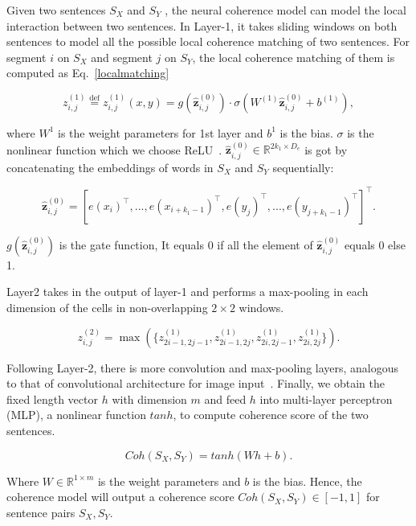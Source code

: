\documentclass[letterpaper]{article} %
\begin{document}
	
	Given two sentences $S_X$ and $S_Y$ , the neural coherence model can model the local interaction between two sentences. In Layer-1, it takes sliding windows on both sentences to model all the possible local coherence matching of two sentences. For segment $i$ on $S_X$ and segment $j$ on $S_Y$, the local coherence matching of them is computed as Eq.~\ref{localmatching}
	
	\begin{equation}
	z^{(1)}_{i,j} \overset{\text{def}}{=}
	z^{(1)}_{i,j}(x,y) =  g(\hat{\mathbf{z}}^{(0)}_{i,j})\cdot \sigma(W^{(1)} \hat{\mathbf{z}}^{(0)}_{i,j} + b^{(1)}),
	\label{localmatching}
	\end{equation}
	
	where $W^1$ is the weight parameters for 1st layer and $b^1$ is the bias. $\sigma$ is the nonlinear function which we choose ReLU~\cite{}. $\hat{\mathbf{z}}^{(0)}_{i,j} \in \mathbb{R}^{2k_1 \times D_{e}}$ is got by concatenating the embeddings of words in $S_X$ and $S_Y$ sequentially:
	
	\begin{equation}
	\hat{\mathbf{z}}^{(0)}_{i,j} =  [e(x_i)^\top, ... , e(x_{i+k_1-1})^\top, e(y_j)^\top,..., e(y_{j+k_1-1})^\top]^\top.
	\end{equation}
	
	\noindent $g(\hat{\mathbf{z}}^{(0)}_{i,j})$ is the gate function, It equals 0 if all the element of $\hat{\mathbf{z}}^{(0)}_{i,j}$ equals 0 else 1.
	
	Layer2 takes in the output of layer-1 and performs a max-pooling in each dimension of the cells in non-overlapping $2\times 2$ windows.
	
	
	\begin{equation}
	z_{i,j}^{(2)} = \max(\{z_{2i-1,2j-1}^{(1)}, z_{2i-1,2j}^{(1)},z_{2i,2j-1}^{(1)},z_{2i,2j}^{(1)}\}). 
	\label{e:2dpool}
	\end{equation}
	
	Following Layer-2, there is more convolution and  max-pooling layers, analogous to that of convolutional architecture for image input~\cite{cnn}. Finally, we obtain the fixed length vector $h$ with dimension $m$ and feed $h$ into multi-layer perceptron (MLP), a nonlinear function $tanh$, to compute coherence score of the two sentences.
	
	\begin{equation}
	Coh(S_X,S_Y) = tanh(W  h+b). 
	\end{equation}
	
	\noindent Where  $ W \in \mathbb{R}^{1 \times m}$ is the weight parameters and $b$ is the bias. Hence, the coherence model will output a coherence score  $Coh(S_X, S_Y) \in [-1,1]$ for sentence pairs $S_X, S_Y$.
	
\end{document}
